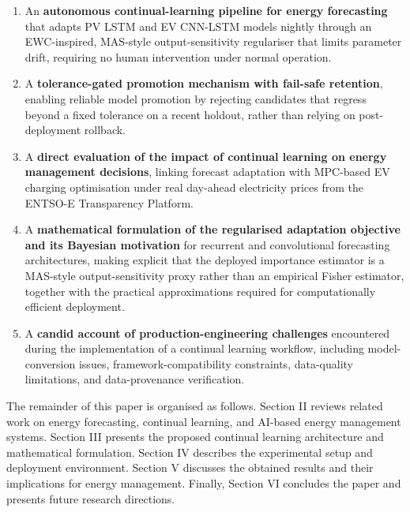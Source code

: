\documentclass[journal]{IEEEtran}
\begin{document}
\begin{enumerate}

    \item An \textbf{autonomous continual-learning pipeline for energy forecasting} that adapts PV LSTM and EV CNN-LSTM models nightly through an EWC-inspired, MAS-style output-sensitivity regulariser that limits parameter drift, requiring no human intervention under normal operation.

    \item A \textbf{tolerance-gated promotion mechanism with fail-safe retention}, enabling reliable model promotion by rejecting candidates that regress beyond a fixed tolerance on a recent holdout, rather than relying on post-deployment rollback.

    \item A \textbf{direct evaluation of the impact of continual learning on energy management decisions}, linking forecast adaptation with MPC-based EV charging optimisation under real day-ahead electricity prices from the ENTSO-E Transparency Platform.

    \item A \textbf{mathematical formulation of the regularised adaptation objective and its Bayesian motivation} for recurrent and convolutional forecasting architectures, making explicit that the deployed importance estimator is a MAS-style output-sensitivity proxy rather than an empirical Fisher estimator, together with the practical approximations required for computationally efficient deployment.

    \item A \textbf{candid account of production-engineering challenges} encountered during the implementation of a continual learning workflow, including model-conversion issues, framework-compatibility constraints, data-quality limitations, and data-provenance verification.

\end{enumerate}

The remainder of this paper is organised as follows. Section II reviews related work on energy forecasting, continual learning, and AI-based energy management systems. Section III presents the proposed continual learning architecture and mathematical formulation. Section IV describes the experimental setup and deployment environment. Section V discusses the obtained results and their implications for energy management. Finally, Section VI concludes the paper and presents future research directions.
\end{document}
